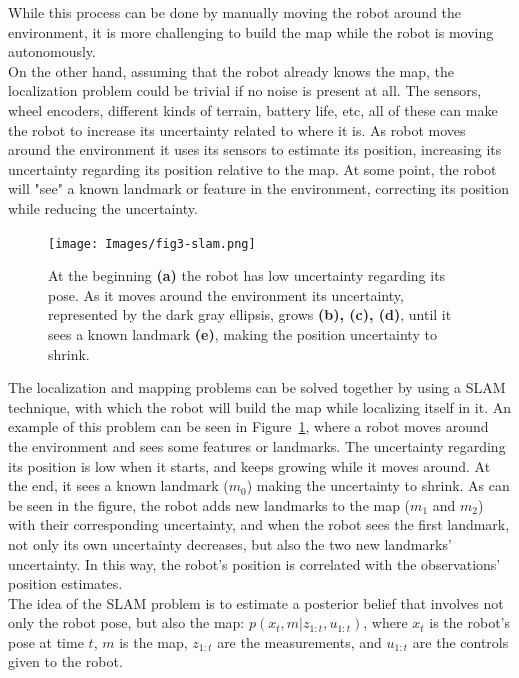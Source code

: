 While this process can be done by manually moving the robot around the environment, it is more challenging to build the map while the robot is moving autonomously. \\

On the other hand, assuming that the robot already knows the map, the localization problem could be trivial if no noise is present at all. The sensors, wheel encoders, different kinds of terrain, battery life, etc, all of these can make the robot to increase its uncertainty related to where it is. As robot moves around the environment it uses its sensors to estimate its position, increasing its uncertainty regarding its position relative to the map. At some point, the robot will "see" a known landmark or feature in the environment, correcting its position while reducing the uncertainty.\\
\begin{figure}
    \centering
    \texttt{[image: Images/fig3-slam.png]}
    \caption[Example of SLAM problem]{At the beginning \textbf{(a)} the robot has low uncertainty regarding its pose. As it moves around the environment its uncertainty, represented by the dark gray ellipsis, grows \textbf{(b), (c), (d)}, until it sees a known landmark \textbf{(e)}, making the position uncertainty to shrink. \cite{intro-aut-mobile-robots}}
    \label{fig:chapter1:slam}
\end{figure}

The localization and mapping problems can be solved together by using a SLAM technique, with which the robot will build the map while localizing itself in it. An example of this problem can be seen in Figure~\ref{fig:chapter1:slam}, where a robot moves around the environment and sees some features or landmarks. The uncertainty regarding its position is low when it starts, and keeps growing while it moves around. At the end, it sees a known landmark ($m_0$) making the uncertainty to shrink. As can be seen in the figure, the robot adds new landmarks to the map ($m_1$ and $m_2$) with their corresponding uncertainty, and when the robot sees the first landmark, not only its own uncertainty decreases, but also the two new landmarks' uncertainty. In this way, the robot's position is correlated with the observations' position estimates.\\

The idea of the SLAM problem is to estimate a posterior belief that involves not only the robot pose, but also the map: $p\left(x_t, m | z_{1:t}, u_{1:t}\right)$, where $x_t$ is the robot's pose at time $t$, $m$ is the map, $z_{1:t}$ are the measurements, and $u_{1:t}$ are the controls given to the robot.

